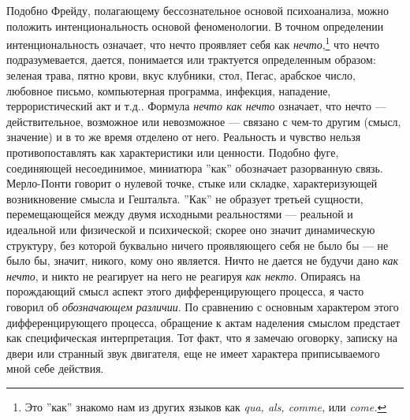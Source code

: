 \documentclass[12pt]{book}
\begin{document}
Подобно Фрейду, полагающему бессознательное основой психоанализа, можно положить интенциональность основой феноменологии. В точном определении интенциональность означает, что нечто проявляет себя как \textit{нечто},\footnote{Это ''как'' знакомо нам из других языков как \textit{qua, als, comme,} или \textit{come.}} что нечто подразумевается, дается, понимается или трактуется определенным образом: зеленая трава, пятно крови, вкус клубники, стол, Пегас, арабское число, любовное письмо, компьютерная программа, инфекция, нападение, террористический акт и т.д.. Формула \textit{нечто как нечто} означает, что нечто --- действительное, возможное или невозможное --- связано с чем-то другим (смысл, значение) и в то же время отделено от него. Реальность и чувство нельзя противопоставлять как характеристики или ценности. Подобно фуге, соединяющей несоединимое, миниатюра ''как'' обозначает разорванную связь. Мерло-Понти говорит о нулевой точке, стыке или складке, характеризующей возникновение смысла и Гештальта. ''Как'' не образует третьей сущности, перемещающейся между двумя исходными реальностями --- реальной и идеальной или физической и психической; скорее оно значит динамическую структуру, без которой буквально ничего проявляющего себя не было бы --- не было бы, значит, никого, кому оно является. Ничто не дается не будучи дано \textit{как нечто}, и никто не реагирует на него не реагируя \textit{как некто}. Опираясь на порождающий смысл аспект этого дифференцирующего процесса, я часто говорил об \textit{обозначающем различии}. По сравнению с основным характером этого дифференцирующего процесса, обращение к актам наделения смыслом предстает как специфическая интерпретация. Тот факт, что я замечаю оговорку, записку на двери или странный звук двигателя, еще не имеет характера приписываемого мной себе действия.
\end{document}
